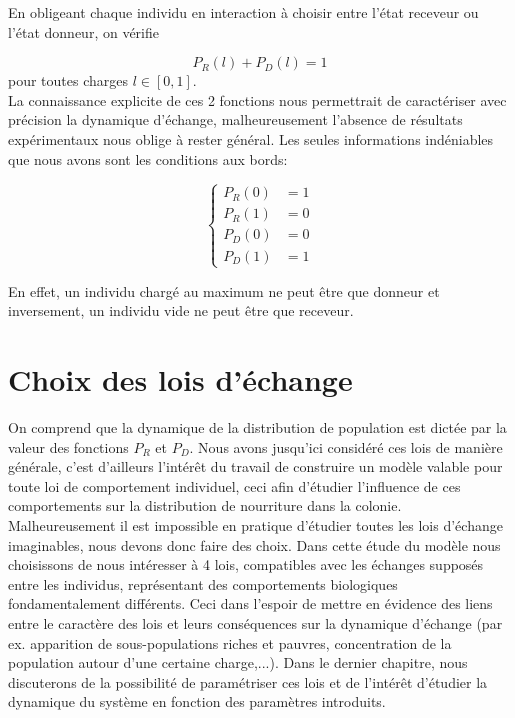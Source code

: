 En obligeant chaque individu en interaction à choisir entre l'état receveur ou l'état donneur, on vérifie

\begin{equation}
P_R(l)+P_D(l) = 1
\label{PRPD1}
\end{equation}
pour toutes charges $l\in[0,1]$.\\

La connaissance explicite de ces 2 fonctions nous permettrait de caractériser avec précision la dynamique d'échange, malheureusement l'absence de résultats expérimentaux nous oblige à rester général. Les seules informations indéniables que nous avons sont les conditions aux bords:

\begin{equation}
\left \{
\begin{aligned}
P_R(0)&=1 \\
P_R(1)&=0 \\
P_D(0)&=0 \\
P_D(1)&=1
\end{aligned}
\right.
\label{ConditionsBordsProbabilite}
\end{equation}

En effet, un individu chargé au maximum ne peut être que donneur et inversement, un individu vide ne peut être que receveur.






\section{Choix des lois d'échange}

On comprend que la dynamique de la distribution de population est dictée par la valeur des fonctions $P_R$ et $P_D$. Nous avons jusqu'ici considéré ces lois de manière générale, c'est d'ailleurs l'intérêt du travail de construire un modèle valable pour toute loi de comportement individuel, ceci afin d'étudier l'influence de ces comportements sur la distribution de nourriture dans la colonie.\\

Malheureusement il est impossible en pratique d'étudier toutes les lois d'échange imaginables, nous devons donc faire des choix. Dans cette étude du modèle nous choisissons de nous intéresser à 4 lois, compatibles avec les échanges supposés entre les individus, représentant des comportements biologiques fondamentalement différents. Ceci dans l'espoir de mettre en évidence des liens entre le caractère des lois et leurs conséquences sur la dynamique d'échange (par ex. apparition de sous-populations riches et pauvres, concentration de la population autour d'une certaine charge,...). Dans le dernier chapitre, nous discuterons de la possibilité de paramétriser ces lois et de l'intérêt d'étudier la dynamique du système en fonction des paramètres introduits.\\


